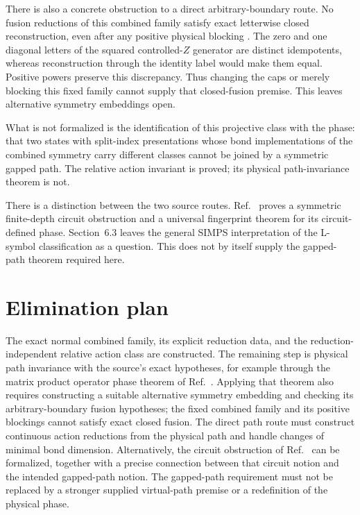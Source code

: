 \documentclass{article}
\begin{document}
There is also a concrete obstruction to a direct arbitrary-boundary route.
No fusion reductions of this combined family satisfy exact letterwise
closed reconstruction, even after any positive physical blocking
.
The zero and one diagonal letters of the squared controlled-$Z$ generator
are distinct idempotents, whereas reconstruction through the identity
label would make them equal. Positive powers preserve this discrepancy.
Thus changing the caps or merely blocking this fixed family cannot supply
that closed-fusion premise. This leaves alternative symmetry embeddings
open.

What is not formalized is the identification of this projective class with
the phase: that two states with split-index presentations whose bond
implementations of the combined symmetry carry different classes cannot be
joined by a symmetric gapped path. The relative action invariant is proved;
its physical path-invariance theorem is not.

There is a distinction between the two source routes.
Ref.~\cite[Sections~3.4 and~3.4.4]{Stephen2024SIMPS} proves a symmetric
finite-depth circuit obstruction and a universal fingerprint theorem for
its circuit-defined phase. Section~6.3 leaves the general SIMPS
interpretation of the L-symbol classification as a question. This does not
by itself supply the gapped-path theorem required here.

\section{Elimination plan}

The exact normal combined family, its explicit reduction data, and the
reduction-independent relative action class are constructed. The remaining
step is physical path invariance with the source's exact hypotheses, for
example through the matrix product operator phase theorem of
Ref.~\cite{GarreRubio2023MPOSym}. Applying that theorem also requires
constructing a suitable alternative symmetry embedding and checking its
arbitrary-boundary fusion hypotheses; the fixed combined family and its
positive blockings cannot satisfy exact closed fusion. The direct path
route must construct continuous action reductions from the physical path
and handle changes of minimal bond dimension.
Alternatively, the circuit obstruction
of Ref.~\cite{Stephen2024SIMPS} can be formalized, together with a precise
connection between that circuit notion and the intended gapped-path notion.
The gapped-path requirement must not be replaced by a stronger supplied
virtual-path premise or a redefinition of the physical phase.



\end{document}
